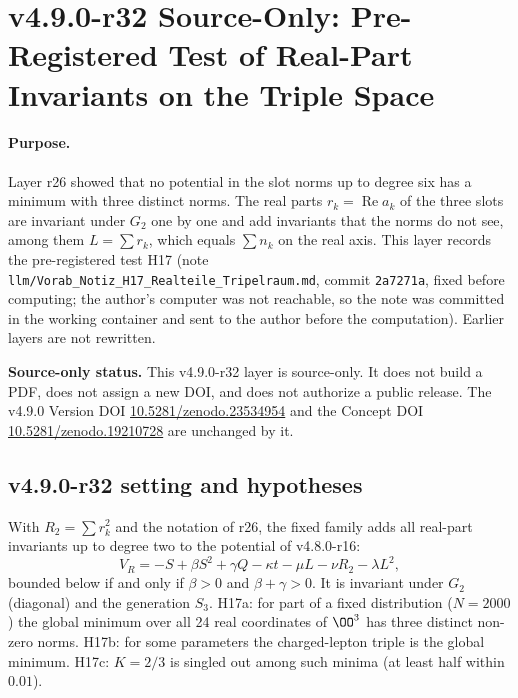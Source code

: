 \clearpage
\section*{v4.9.0-r32 Source-Only: Pre-Registered Test of Real-Part Invariants on the Triple Space}
\label{sec:v490-r32-real-part-triple-space}

\paragraph{Purpose.}
Layer r26 showed that no potential in the slot norms up to degree six has a minimum with three distinct norms.  The real
parts \(r_k=\operatorname{Re}a_k\) of the three slots are invariant under \(G_2\) one by one and add invariants that
the norms do not see, among them \(L=\sum r_k\), which equals \(\sum n_k\) on the real axis.  This layer records the
pre-registered test H17 (note \texttt{llm/Vorab\_Notiz\_H17\_Realteile\_Tripelraum.md}, commit \texttt{2a7271a}, fixed
before computing; the author's computer was not reachable, so the note was committed in the working container and
sent to the author before the computation).  Earlier layers are not rewritten.

\noindent\textbf{Source-only status.}
This v4.9.0-r32 layer is source-only.  It does not build a PDF, does not assign a new DOI,
and does not authorize a public release.  The v4.9.0 Version DOI
\href{https://doi.org/10.5281/zenodo.23534954}{10.5281/zenodo.23534954} and the Concept DOI
\href{https://doi.org/10.5281/zenodo.19210728}{10.5281/zenodo.19210728} are unchanged by it.

\subsection*{v4.9.0-r32 setting and hypotheses}
\label{subsec:v490-r32-setting}

With \(R_2=\sum r_k^2\) and the notation of r26, the fixed family adds all real-part invariants up to degree two to the
potential of v4.8.0-r16:
\[
V_R=-S+\beta S^2+\gamma Q-\kappa t-\mu L-\nu R_2-\lambda L^2 ,
\]
bounded below if and only if \(\beta>0\) and \(\beta+\gamma>0\).  It is invariant under \(G_2\) (diagonal) and the
generation \(S_3\).  H17a: for part of a fixed distribution (\(N=2000\)) the global minimum over all 24 real
coordinates of \(\OO^3\) has three distinct non-zero norms.  H17b: for some parameters the charged-lepton triple is the
global minimum.  H17c: \(K=2/3\) is singled out among such minima (at least half within \(0.01\)).

